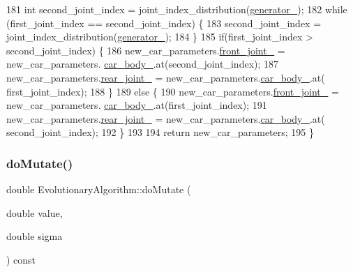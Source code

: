 \begin{DoxyCode}
181     \textcolor{keywordtype}{int} second\_joint\_index = joint\_index\_distribution(\hyperlink{classEvolutionaryAlgorithm_adbd823d385ad95bf20496fd2fc25ccde}{generator\_});
182     \textcolor{keywordflow}{while} (first\_joint\_index == second\_joint\_index) \{
183         second\_joint\_index = joint\_index\_distribution(\hyperlink{classEvolutionaryAlgorithm_adbd823d385ad95bf20496fd2fc25ccde}{generator\_});
184     \}
185     \textcolor{keywordflow}{if}(first\_joint\_index > second\_joint\_index) \{
186         new\_car\_parameters.\hyperlink{classCarParameters_a471bcf264de846ca28e52bde8780f6a8}{front\_joint\_} = new\_car\_parameters.
      \hyperlink{classCarParameters_a304345d7fd7771c87421e87785bce810}{car\_body\_}.at(second\_joint\_index);
187         new\_car\_parameters.\hyperlink{classCarParameters_aec19cf9d1c6ab5f00ac5ff166ee0015a}{rear\_joint\_} = new\_car\_parameters.\hyperlink{classCarParameters_a304345d7fd7771c87421e87785bce810}{car\_body\_}.at(
      first\_joint\_index);
188     \}
189     \textcolor{keywordflow}{else} \{
190         new\_car\_parameters.\hyperlink{classCarParameters_a471bcf264de846ca28e52bde8780f6a8}{front\_joint\_} = new\_car\_parameters.
      \hyperlink{classCarParameters_a304345d7fd7771c87421e87785bce810}{car\_body\_}.at(first\_joint\_index);
191         new\_car\_parameters.\hyperlink{classCarParameters_aec19cf9d1c6ab5f00ac5ff166ee0015a}{rear\_joint\_} = new\_car\_parameters.\hyperlink{classCarParameters_a304345d7fd7771c87421e87785bce810}{car\_body\_}.at(
      second\_joint\_index);
192     \}
193 
194     \textcolor{keywordflow}{return} new\_car\_parameters;
195 \}
\end{DoxyCode}
\mbox{\label{classEvolutionaryAlgorithm_a02a05f75707440141d9ec3129cadc681}} 
\subsubsection{\texorpdfstring{do\+Mutate()}{doMutate()}}
{\footnotesize\ttfamily double Evolutionary\+Algorithm\+::do\+Mutate (\begin{DoxyParamCaption}\item[{double}]{value,  }\item[{double}]{sigma }\end{DoxyParamCaption}) const\hspace{0.3cm}{\ttfamily [private]}}




